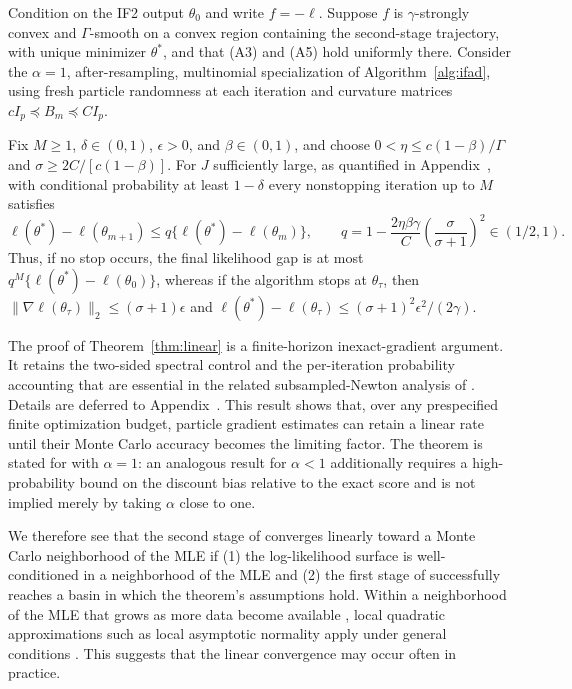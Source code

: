 \begin{thm}
\label{thm:linear}\label{thm:mop-convergence}
Condition on the IF2 output $\theta_0$ and write $f=-\ell$.  Suppose $f$ is
$\gamma$-strongly convex and $\Gamma$-smooth on a convex region containing the
second-stage trajectory, with unique minimizer $\theta^*$, and that (A3) and
(A5) hold uniformly there.  Consider the $\alpha=1$, after-resampling,
multinomial specialization of Algorithm~\ref{alg:ifad}, using fresh particle
randomness at each iteration and curvature matrices
$cI_p\preceq B_m\preceq CI_p$.

Fix $M\geq1$, $\delta\in(0,1)$, $\epsilon>0$, and $\beta\in(0,1)$, and choose
$0<\eta\leq c(1-\beta)/\Gamma$ and
$\sigma\geq2C/[c(1-\beta)]$.  For $J$ sufficiently large, as quantified in
Appendix~\suppSecProofOptimizationConvergence, with conditional probability at
least $1-\delta$ every nonstopping iteration up to $M$ satisfies
\[
\ell(\theta^*)-\ell(\theta_{m+1})
\leq q\{\ell(\theta^*)-\ell(\theta_m)\},
\qquad
q=1-\frac{2\eta\beta\gamma}{C}
\left(\frac{\sigma}{\sigma+1}\right)^2\in(1/2,1).
\]
Thus, if no stop occurs, the final likelihood gap is at most
$q^M\{\ell(\theta^*)-\ell(\theta_0)\}$, whereas if the algorithm stops at
$\theta_\tau$, then
$\|\nabla\ell(\theta_\tau)\|_2\leq(\sigma+1)\epsilon$ and
$\ell(\theta^*)-\ell(\theta_\tau)
\leq(\sigma+1)^2\epsilon^2/(2\gamma)$.
\end{thm}
The proof of Theorem~\ref{thm:linear} is a finite-horizon inexact-gradient
argument.  It retains the two-sided spectral control and the per-iteration
probability accounting that are essential in the related subsampled-Newton
analysis of \cite{mahoney16}.
Details are deferred to Appendix~\suppSecProofOptimizationConvergence. 
This result shows that, over any prespecified finite optimization budget,
particle gradient estimates can retain a linear rate until their Monte Carlo
accuracy becomes the limiting factor.  The theorem is stated for  with $\alpha=1$:
an analogous result for $\alpha<1$ additionally requires a high-probability
bound on the discount bias relative to the exact score and is not implied merely
by taking $\alpha$ close to one.

We therefore see that the second stage of  converges linearly toward a
Monte Carlo neighborhood of the MLE if (1) the log-likelihood surface is
well-conditioned in a neighborhood of the MLE and (2) the first stage of 
successfully reaches a basin in which the theorem's assumptions hold.
Within a neighborhood of the MLE that grows as more data become available \citep{ning21}, local quadratic approximations such as local asymptotic normality apply under general conditions \citep{lecam00}.
This suggests that the linear convergence may occur often in practice.


